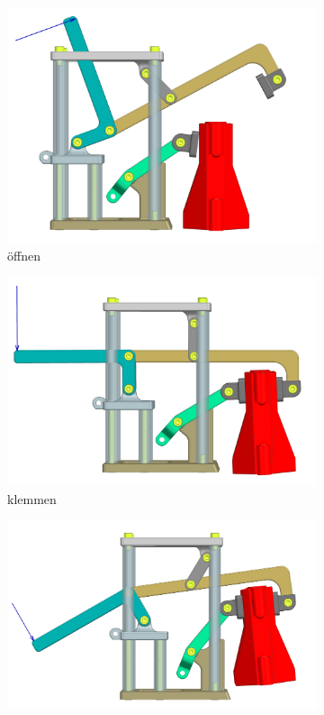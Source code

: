 \begin{figure}[H]
\begin{subfigure}{0.55\textwidth}
\includegraphics[width=\textwidth]{assets/greifer-prototyp/Greifer_side_Offen.png}
\caption{öffnen}
\label{fig:gripper_opening_side}
\end{subfigure}
\begin{subfigure}{0.55\textwidth}
\includegraphics[width=\textwidth]{assets/greifer-prototyp/Greifer_side_Klemmen.png}
\caption{klemmen}
\label{fig:gripper_gripping_side}
\end{subfigure}
\begin{subfigure}{0.55\textwidth}
\includegraphics[width=\textwidth]{assets/greifer-prototyp/Greifer_side_Angehoben.png}

\end{subfigure}
\end{figure}
